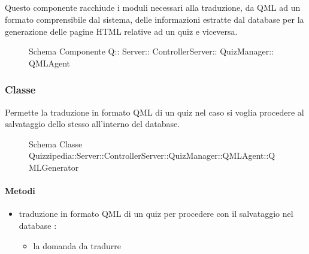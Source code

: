 \subsection{}
Questo componente racchiude i moduli necessari alla traduzione, da QML ad un formato comprensibile dal sistema, delle informazioni estratte dal database per la generazione delle pagine HTML relative ad un quiz e viceversa.
\begin{figure}[H]
\centering
\noindent{}
\caption[Schema Componente Quizzipedia::Server::ControllerServer::QuizManager::QMLAgent]{Schema Componente Q:: Server:: ControllerServer:: QuizManager:: QMLAgent}
\end{figure}
\subsubsection{Classe }
Permette la traduzione in formato QML di un quiz nel caso si voglia procedere al salvataggio dello stesso all'interno del database.
\begin{figure}[H]
\centering
\noindent{}
\caption[Schema Classe QMLGenerator]{Schema Classe Quizzipedia::Server::ControllerServer::QuizManager::QMLAgent::QMLGenerator}
\end{figure}
\paragraph{Metodi}
\begin{itemize}
\item {}
\newline
traduzione in formato QML di un quiz per procedere con il salvataggio nel database
\newline
{} :
\begin{itemize}
\item {}
\newline
la domanda da tradurre
\end{itemize}
\end{itemize}

